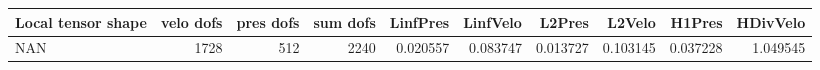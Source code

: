 \begin{tabular}{lrrrrrrrrr}
\toprule
Local tensor shape &  velo dofs &  pres dofs &  sum dofs &  LinfPres &  LinfVelo &   L2Pres &   L2Velo &   H1Pres &  HDivVelo \\
\midrule
               NAN &       1728 &        512 &      2240 &  0.020557 &  0.083747 & 0.013727 & 0.103145 & 0.037228 &  1.049545 \\
\bottomrule
\end{tabular}
